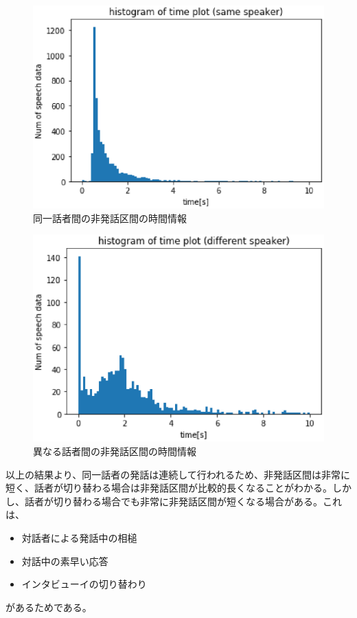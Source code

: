 \begin{figure}[H]
  \begin{center}
    \includegraphics{./figure/same_sp.eps}
  \end{center}
  \caption{同一話者間の非発話区間の時間情報 \label{fig:same_sp}}
\end{figure}

\begin{figure}[H]
  \begin{center}
    \includegraphics{./figure/different_sp.eps}
  \end{center}
  \caption{異なる話者間の非発話区間の時間情報 \label{fig:different_sp}}
\end{figure}

以上の結果より、同一話者の発話は連続して行われるため、非発話区間は非常に短く、話者が切り替わる場合は非発話区間が比較的長くなることがわかる。しかし、話者が切り替わる場合でも非常に非発話区間が短くなる場合がある。これは、

\begin{itemize}
\item 対話者による発話中の相槌
\item 対話中の素早い応答
\item インタビューイの切り替わり
\end{itemize}

があるためである。
